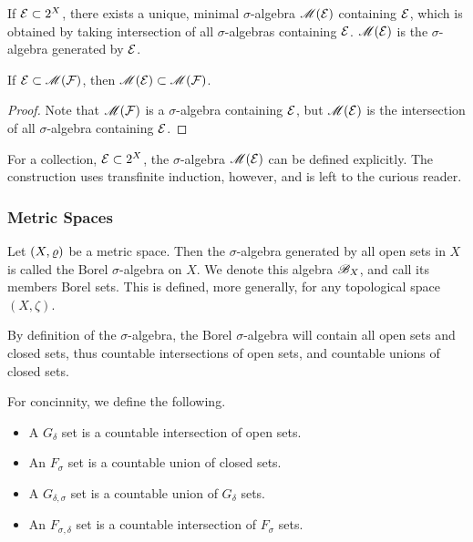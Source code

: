 \documentclass[12pt]{article} %
\begin{document}
\begin{proposition}
    If $\mathcal{E} \subset 2^X$, there exists a unique, minimal $\sigma$-algebra $\mathscr{M}(\mathcal{E})$ containing $\mathcal{E}$, which is obtained by taking intersection of all $\sigma$-algebras containing $\mathcal{E}$. $\mathscr{M}(\mathcal{E})$ is the $\sigma$-algebra generated by $\mathcal{E}$.
\end{proposition}


\begin{lemma}
    If $\mathcal{E} \subset \mathscr{M}(\mathcal{F})$, then $\mathscr{M}(\mathcal{E}) \subset \mathscr{M}(\mathcal{F})$.
\end{lemma}

\begin{proof}
    Note that $\mathscr{M}(\mathcal{F})$ is a $\sigma$-algebra containing $\mathcal{E}$, but $\mathscr{M}(\mathcal{E})$ is the intersection of all $\sigma$-algebra containing $\mathcal{E}$.
\end{proof}

\noindent For a collection, $\mathcal{E} \subset 2^X$, the $\sigma$-algebra $\mathscr{M}(\mathcal{E})$ can be defined explicitly. The construction uses transfinite induction, however, and is left to the curious reader.

\subsubsection{Metric Spaces}

\begin{definition}
    Let $(X, \varrho)$ be a metric space. Then the $\sigma$-algebra generated by all open sets in $X$ is called the Borel $\sigma$-algebra on $X$. We denote this algebra $\mathscr{B}_X$, and call its members Borel sets. This is defined, more generally, for any topological space $(X, \zeta)$.
\end{definition}

\begin{remark}
    By definition of the $\sigma$-algebra, the Borel $\sigma$-algebra will contain all open sets and closed sets, thus countable intersections of open sets, and countable unions of closed sets.
\end{remark}

\begin{definition}
    For concinnity, we define the following.
    \begin{itemize}
        \item A $G_\delta$ set is a countable intersection of open sets.
        \item An $F_\sigma$ set is a countable union of closed sets.
        \item A $G_{\delta, \sigma}$ set is a countable union of $G_\delta$ sets.
        \item An $F_{\sigma, \delta}$ set is a countable intersection of $F_\sigma$ sets.
    \end{itemize}
\end{definition}
\end{document}

